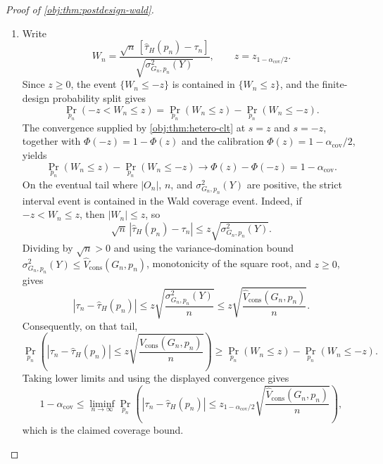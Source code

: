 \documentclass[11pt]{article}
\begin{document}
\begin{proof}[Proof of \cref{obj:thm:postdesign-wald}]
\begin{enumerate}
\item Write
\[
W_n=
\frac{\sqrt n\,[\widehat\tau_H(p_n)-\tau_n]}
{\sqrt{\sigma^2_{G_n,p_n}(Y)}},
\qquad
z=z_{1-\alpha_{\mathrm{cov}}/2}.
\]
Since \(z\ge0\), the event \(\{W_n\le -z\}\) is contained in \(\{W_n\le z\}\), and the finite-design probability split gives
\[
\Pr_{p_n}\!\left(-z<W_n\le z\right)
=\Pr_{p_n}\!\left(W_n\le z\right)-\Pr_{p_n}\!\left(W_n\le -z\right).
\]
The convergence supplied by \cref{obj:thm:hetero-clt} at \(s=z\) and \(s=-z\), together with
\(\Phi(-z)=1-\Phi(z)\) and the calibration \(\Phi(z)=1-\alpha_{\mathrm{cov}}/2\), yields
\[
\Pr_{p_n}\!\left(W_n\le z\right)-\Pr_{p_n}\!\left(W_n\le -z\right)
\longrightarrow
\Phi(z)-\Phi(-z)
=1-\alpha_{\mathrm{cov}} .
\]
On the eventual tail where \(|O_n|\), \(n\), and \(\sigma^2_{G_n,p_n}(Y)\) are positive, the strict interval event is contained in the Wald coverage event.  Indeed, if
\(-z<W_n\le z\), then \(|W_n|\le z\), so
\[
\sqrt n\,|\widehat\tau_H(p_n)-\tau_n|
\le z\sqrt{\sigma^2_{G_n,p_n}(Y)}.
\]
Dividing by \(\sqrt n>0\) and using the variance-domination bound
\(\sigma^2_{G_n,p_n}(Y)\le \widehat V_{\mathrm{cons}}(G_n,p_n)\), monotonicity of the square root, and \(z\ge0\), gives
\[
\left|\tau_n-\widehat\tau_H(p_n)\right|
\le
z
\sqrt{\frac{\sigma^2_{G_n,p_n}(Y)}{n}}
\le
z
\sqrt{\frac{\widehat V_{\mathrm{cons}}(G_n,p_n)}{n}}.
\]
Consequently, on that tail,
\[
\Pr_{p_n}\!\left(
\left|\tau_n-\widehat\tau_H(p_n)\right|
\le
z\sqrt{\frac{\widehat V_{\mathrm{cons}}(G_n,p_n)}{n}}
\right)
\ge
\Pr_{p_n}\!\left(W_n\le z\right)-\Pr_{p_n}\!\left(W_n\le -z\right).
\]
Taking lower limits and using the displayed convergence gives
\[
1-\alpha_{\mathrm{cov}}
\le
\liminf_{n\to\infty}
\Pr_{p_n}\!\left(
\left|\tau_n-\widehat\tau_H(p_n)\right|
\le
z_{1-\alpha_{\mathrm{cov}}/2}
\sqrt{\frac{\widehat V_{\mathrm{cons}}(G_n,p_n)}{n}}
\right),
\]
which is the claimed coverage bound.
\end{enumerate}
\end{proof}
\end{document}
